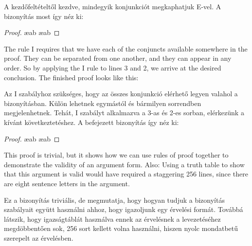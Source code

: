 A kezdőfeltételtől kezdve, mindegyik konjunkciót megkaphatjuk {\eand}E-vel. A bizonyítás most így néz ki: 

\begin{proof}
	 \ae{ab}
	 \ae{ab}
\end{proof}

The rule {\eand}I requires that we have each of the conjuncts available somewhere in the proof. They can be separated from one another, and they can appear in any order. So by applying the {\eand}I rule to lines 3 and 2, we arrive at the desired conclusion. The finished proof looks like this:

Az {\eand}I szabályhoz szükséges, hogy az összes konjunkció elérhető legyen valahol a bizonyításban. Külön lehetnek egymástól és bármilyen sorrendben megjelenhetnek. Tehát, {\eand}I szabályt alkalmazva a 3-as és 2-es sorban, elérkezünk a kívánt következtetéshez. A befejezett bizonyítás így néz ki:

\begin{proof}

	 \ae{ab}
	 \ae{ab}
	 
\end{proof}

This proof is trivial, but it shows how we can use rules of proof together to demonstrate the validity of an argument form. Also: Using a truth table to show that this argument is valid would have required a staggering 256 lines, since there are eight sentence letters in the argument.

Ez a bizonyítás triviális, de megmutatja, hogy hogyan tudjuk a bizonyítás szabályait együtt használni ahhoz, hogy igazoljunk egy érvelési formát. Továbbá látszik, hogy igazságtáblát használva  ennek az érvelésnek a levezetéséhez megdöbbentően sok, 256 sort kellett volna használni, hiszen nyolc mondatbetű szerepelt az érvelésben.




